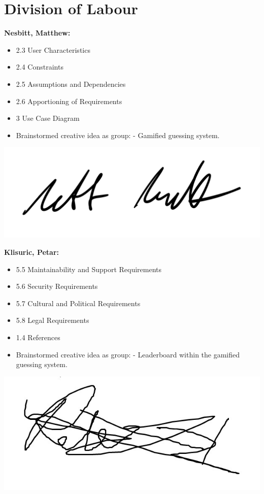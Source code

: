 \documentclass[]{article}
\begin{document}
\section{Division of Labour}
\label{sec:division_of_labour}
\textbf{Nesbitt, Matthew:}
\begin{itemize}
	\item 2.3 User Characteristics
	\item 2.4 Constraints
	\item 2.5 Assumptions and Dependencies
	\item 2.6 Apportioning of Requirements
	\item 3 Use Case Diagram
	\item Brainstormed creative idea as group:
		\subitem - Gamified guessing system.
\end{itemize}
\includegraphics[scale=0.15]{mattsignature.jpg}

\textbf{Klisuric, Petar:}
\begin{itemize}
	\item 5.5 Maintainability and Support Requirements
	\item 5.6 Security Requirements
	\item 5.7 Cultural and Political Requirements
	\item 5.8 Legal Requirements
	\item 1.4 References
    \item Brainstormed creative idea as group:
		\subitem - Leaderboard within the gamified guessing system.
\end{itemize}
\includegraphics[scale=0.15]{petarsignature.jpg}
\end{document}
